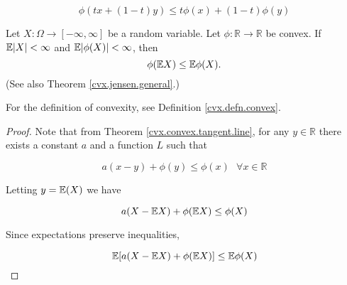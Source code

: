 \begin{itemize}
\begin{itemize}
\begin{definition}
\[
\phi(tx + (1-t)y) \leq t \phi(x) + (1-t) \phi(y)
\]
 \end{definition}
 
% 
% 
% 

%

\begin{theorem}\label{asym.jensen.general}Let $X:\Omega\to[-\infty,\infty]$ be a random variable.  Let $\phi:\mathbb{R}\to\mathbb{R}$ be convex. If $\mathbb{E}|X|<\infty$ and $\mathbb{E}|\phi(X)|<\infty$, then
$$\phi(\mathbb{E} X)\leq \mathbb{E} \phi(X).$$ (See also Theorem \ref{cvx.jensen.general}.)
\end{theorem}

For the definition of convexity, see Definition \ref{cvx.defn.convex}.

\begin{proof}Note that from Theorem \ref{cvx.convex.tangent.line}, for any \(y \in \mathbb{R}\) there exists a constant \(a\) and a function \(L\) such that

\[
a(x-y)+\phi(y) \leq \phi(x) \ \ \ \forall x \in \mathbb{R}
\]

Letting \(y = \mathbb{E}(X)\) we have

\[
a (X-\mathbb{E} X)+\phi(\mathbb{E} X) \leq \phi(X)
\]

Since expectations preserve inequalities,

\[
\mathbb{E}[a (X-\mathbb{E} X)+\phi(\mathbb{E} X)] \leq \mathbb{E} \phi(X)
\]


\end{proof}
\end{itemize}
\end{itemize}
